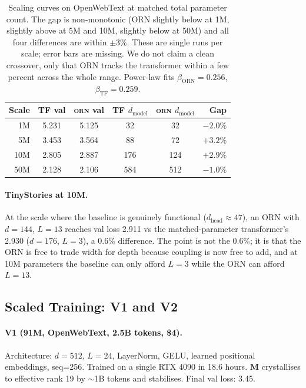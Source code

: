 \documentclass[10pt,twocolumn]{article}
\newcommand{\M}{\mathbf{M}}
\newcommand{\orn}{\textsc{orn}}
\begin{document}
\begin{table}[t]
\centering\small
\begin{tabular}{@{}rccccr@{}}
\toprule
\textbf{Scale} & \textbf{TF val} & \textbf{\orn{} val} & \textbf{TF $d_\text{model}$} & \textbf{\orn{} $d_\text{model}$} & \textbf{Gap} \\
\midrule
1M  & 5.231 & 5.125 & 32  & 32  & $-2.0\%$ \\
5M  & 3.453 & 3.564 & 88  & 72  & $+3.2\%$ \\
10M & 2.805 & 2.887 & 176 & 124 & $+2.9\%$ \\
50M & 2.128 & 2.106 & 584 & 512 & $-1.0\%$ \\
\bottomrule
\end{tabular}
\caption{Scaling curves on OpenWebText at matched total parameter count. The gap is non-monotonic (ORN slightly below at 1M, slightly above at 5M and 10M, slightly below at 50M) and all four differences are within $\pm 3\%$. These are single runs per scale; error bars are missing. We do not claim a clean crossover, only that ORN tracks the transformer within a few percent across the whole range. Power-law fits $\beta_\text{ORN} = 0.256$, $\beta_\text{TF} = 0.259$.}
\label{tab:scaling}
\end{table}

\paragraph{TinyStories at 10M.}
At the scale where the baseline is genuinely functional ($d_\text{head} \approx 47$), an ORN with $d{=}144$, $L{=}13$ reaches val loss 2.911 vs the matched-parameter transformer's 2.930 ($d{=}176$, $L{=}3$), a 0.6\% difference.
The point is not the 0.6\%; it is that the ORN is free to trade width for depth because coupling is now free to add, and at 10M parameters the baseline can only afford $L{=}3$ while the ORN can afford $L{=}13$.

\subsection{Scaled Training: V1 and V2}

\paragraph{V1 (91M, OpenWebText, 2.5B tokens, \$4).}
Architecture: $d{=}512$, $L{=}24$, LayerNorm, GELU, learned positional embeddings, seq=256.
Trained on a single RTX 4090 in 18.6 hours.
$\M$ crystallises to effective rank 19 by $\sim$1B tokens and stabilises.
Final val loss: 3.45.
\end{document}
